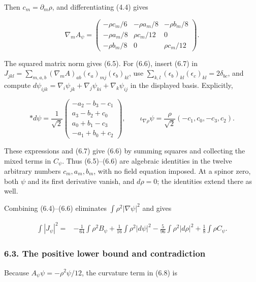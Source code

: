 \documentclass[
  11pt,
]{article}
\begin{document}
Then \(c_m=\partial_m\rho\), and differentiating (4.4) gives

\[
 \nabla_m A_\psi=
 \begin{pmatrix}
  -\rho c_m/6&-\rho a_m/8&-\rho b_m/8\\
  -\rho a_m/8&\rho c_m/12&0\\
  -\rho b_m/8&0&\rho c_m/12
 \end{pmatrix}.                                         \tag{6.7}
\]

The squared matrix norm gives (6.5). For (6.6), insert (6.7) in
\(J_{jkl}=\sum_{m,a,b}(\nabla_mA)_{ab}(\epsilon_a)_{mj}(\epsilon_b)_{kl}\),
use \(\sum_{k,l}(\epsilon_b)_{kl}(\epsilon_c)_{kl}=2\delta_{bc}\), and
compute
\(d\psi_{ijk}=\nabla_i\psi_{jk}+\nabla_j\psi_{ki} +\nabla_k\psi_{ij}\)
in the displayed basis. Explicitly,

\[
 *d\psi=\frac1{\sqrt2}
 \begin{pmatrix}
  -a_2-b_3-c_1\\
   a_3-b_2+c_0\\
   a_0+b_1-c_3\\
  -a_1+b_0+c_2
 \end{pmatrix},
 \qquad
 \iota_{\nabla\rho}\psi
       =\frac{\rho}{\sqrt2}(-c_1,c_0,-c_3,c_2).
\]

These expressions and (6.7) give (6.6) by summing squares and collecting
the mixed terms in \(C_\psi\). Thus (6.5)--(6.6) are algebraic
identities in the twelve arbitrary numbers \(c_m,a_m,b_m\), with no
field equation imposed. At a spinor zero, both \(\psi\) and its first
derivative vanish, and \(d\rho=0\); the identities extend there as well.

Combining (6.4)--(6.6) eliminates \(\int\rho^2|\nabla\psi|^2\) and gives

\[
 \begin{split}
 \int|J_\psi|^2={}&-\frac1{64}\int\rho^2 B_\psi
       +\frac1{16}\int\rho^2|d\psi|^2
       -\frac5{96}\int\rho^2|d\rho|^2
       +\frac18\int\rho C_\psi.
 \end{split}                                              \tag{6.8}
\]

\hypertarget{the-positive-lower-bound-and-contradiction}{%
\subsubsection{6.3. The positive lower bound and
contradiction}\label{the-positive-lower-bound-and-contradiction}}

Because \(A_\psi\psi=-\rho^2\psi/12\), the curvature term in (6.8) is
\end{document}
